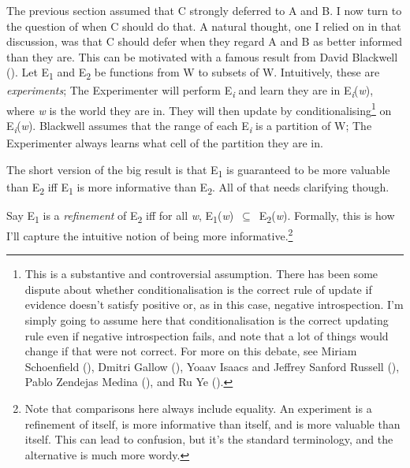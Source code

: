 \documentclass[
  12pt,
  letterpaper,
  DIV=11,
  numbers=noendperiod]{scrartcl}
\begin{document}
The previous section assumed that C strongly deferred to A and B. I now
turn to the question of when C should do that. A natural thought, one I
relied on in that discussion, was that C should defer when they regard A
and B as better informed than they are. This can be motivated with a
famous result from David Blackwell ().
Let E\textsubscript{1} and E\textsubscript{2} be functions from W to
subsets of W. Intuitively, these are \emph{experiments}; The
Experimenter will perform E\textsubscript{\emph{i}} and learn they are
in E\emph{\textsubscript{i}}(\emph{w}), where \emph{w} is the world they
are in. They will then update by conditionalising\footnote{This is a
  substantive and controversial assumption. There has been some dispute
  about whether conditionalisation is the correct rule of update if
  evidence doesn't satisfy positive or, as in this case, negative
  introspection. I'm simply going to assume here that conditionalisation
  is the correct updating rule even if negative introspection fails, and
  note that a lot of things would change if that were not correct. For
  more on this debate, see Miriam Schoenfield
  (), Dmitri Gallow
  (), Yoaav Isaacs and Jeffrey Sanford
  Russell (), Pablo Zendejas Medina
  (), and Ru Ye
  ().} on
E\emph{\textsubscript{i}}(\emph{w}). Blackwell assumes that the range of
each E\textsubscript{\emph{i}} is a partition of W; The Experimenter
always learns what cell of the partition they are in.

The short version of the big result is that E\textsubscript{1} is
guaranteed to be more valuable than E\textsubscript{2} iff
E\textsubscript{1} is more informative than E\textsubscript{2}. All of
that needs clarifying though.

Say E\textsubscript{1} is a \emph{refinement} of E\textsubscript{2} iff
for all \emph{w},
E\textsubscript{1}(\emph{w})~$\subseteq$~E\textsubscript{2}(\emph{w}). Formally,
this is how I'll capture the intuitive notion of being more
informative.\footnote{Note that comparisons here always include
  equality. An experiment is a refinement of itself, is more informative
  than itself, and is more valuable than itself. This can lead to
  confusion, but it's the standard terminology, and the alternative is
  much more wordy.}
\end{document}
